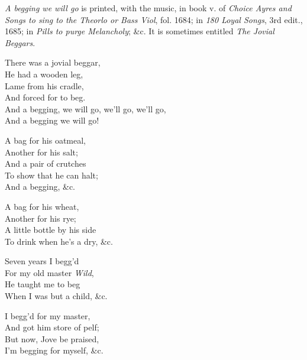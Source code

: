 \textit{A begging we will go} is printed, with the music, in book v. of \textit{Choice Ayres
and Songs to sing to the Theorlo or Bass Viol}, fol. 1684; in \textit{180 Loyal Songs},
3rd edit., 1685; in \textit{ Pills to purge Melancholy}; \&c. It is sometimes entitled
\textit{The Jovial Beggars}.
\settowidth{\versewidth}{And a begging, we will go, we’ll go, we’ll go,}
\begin{dcverse}\begin{patverse}
\vin {}There was a jovial beggar,\\
He had a wooden leg,\\
Lame from his cradle,\\
And forced for to beg.\\
And a begging, we will go, we’ll go, we’ll go,\\
And a begging we will go!
\end{patverse}

\begin{patverse}
\vin A bag for his oatmeal,\\
Another for his salt;\\
And a pair of crutches\\
To show that he can halt;\\
And a begging, \&c.
\end{patverse}

\begin{patverse}
\vin A bag for his wheat,\\
Another for his rye;\\
A little bottle by his side\\
To drink when he’s a dry, \&c.
\end{patverse}

\begin{patverse}
\vin Seven years I begg’d\\
For my old master \textit{Wild},\\
He taught me to beg\\
When I was but a child, \&c.
\end{patverse}

\begin{patverse}
\vin I begg’d for my master,\\
And got him store of pelf;\\
But now, Jove be praised,\\
I’m begging for myself, \&c.
\end{patverse}


\end{dcverse}

